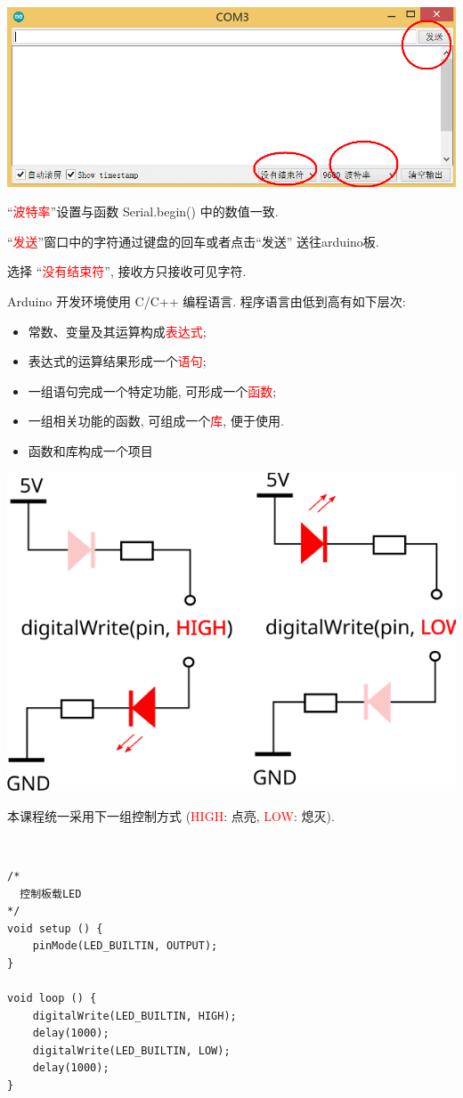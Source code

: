 \documentclass[a4paper,11pt]{seminar}
\newcommand{\alert}[1]{\textcolor{red}{#1}}
\begin{document}
\begin{center}
\includegraphics[width=.8\textwidth]{serial}
\end{center}

``\alert{波特率}''设置与函数 Serial.begin() 中的数值一致.

``\alert{发送}''窗口中的字符通过键盘的回车或者点击``发送'' 送往arduino板.

选择 ``\alert{没有结束符}'', 接收方只接收可见字符.
\endslide

Arduino 开发环境使用 C/C++ 编程语言. 程序语言由低到高有如下层次:
\begin{itemize}
    \item 常数、变量及其运算构成\alert{表达式};
    \item 表达式的运算结果形成一个\alert{语句};
    \item 一组语句完成一个特定功能, 可形成一个\alert{函数};
    \item 一组相关功能的函数, 可组成一个\alert{库}, 便于使用.
    \item 函数和库构成一个项目
\end{itemize}
\endslide


\begin{center}
\includegraphics[width=.6\textwidth]{pincontrol}
\end{center}
本课程统一采用下一组控制方式 (\alert{HIGH}: 点亮, \alert{LOW}: 熄灭).
\endslide

~\ \vskip-6mm
\begin{lstlisting}
/*
  控制板载LED
*/
void setup () {
    pinMode(LED_BUILTIN, OUTPUT);
}

void loop () {
    digitalWrite(LED_BUILTIN, HIGH);
    delay(1000);
    digitalWrite(LED_BUILTIN, LOW);
    delay(1000);
}
\end{lstlisting}
\endslide
\end{document}
